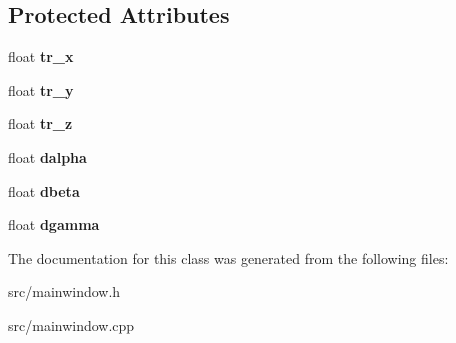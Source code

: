 \subsection*{Protected Attributes}
\begin{DoxyCompactItemize}
\item 
\mbox{\label{class_main_window_a243e9877c34fca99ca8eb8233e602e80}} 
float {\bfseries tr\+\_\+x}
\item 
\mbox{\label{class_main_window_a93fc2a7aa546e29b1ec00c81d278d9c2}} 
float {\bfseries tr\+\_\+y}
\item 
\mbox{\label{class_main_window_a48e1e4cfdaa4d52f32b46ece5e1e785b}} 
float {\bfseries tr\+\_\+z}
\item 
\mbox{\label{class_main_window_a8a40d17a32ac50fc54faf17a3ddc1b21}} 
float {\bfseries dalpha}
\item 
\mbox{\label{class_main_window_a7a6b42f86582dd883162c70d4a4915c8}} 
float {\bfseries dbeta}
\item 
\mbox{\label{class_main_window_ac10de49b138c1c838d53e12da4c24d6d}} 
float {\bfseries dgamma}
\end{DoxyCompactItemize}


The documentation for this class was generated from the following files\+:\begin{DoxyCompactItemize}
\item 
src/mainwindow.\+h\item 
src/mainwindow.\+cpp\end{DoxyCompactItemize}
